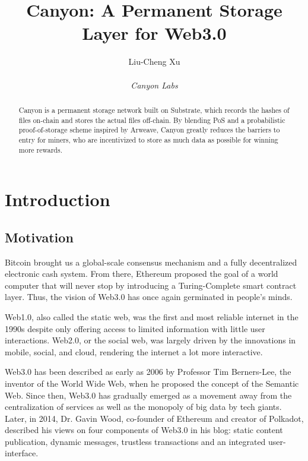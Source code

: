 \documentclass[]{article}
\title{Canyon: A Permanent Storage Layer for Web3.0}
\author{
    Liu-Cheng Xu\\
    \\
    \textit{Canyon Labs}
}
\date{}
\begin{document}
\maketitle

\begin{abstract}

Canyon is a permanent storage network built on Substrate, which records the hashes of files on-chain and stores the actual files off-chain. By blending PoS and a probabilistic proof-of-storage scheme inspired by Arweave, Canyon greatly reduces the barriers to entry for miners, who are incentivized to store as much data as possible for winning more rewards.

\end{abstract}

\tableofcontents

\newpage

\section{Introduction}

\subsection{Motivation}

Bitcoin\cite{bitcoin} brought us a global-scale consensus mechanism and a fully decentralized electronic cash system. From there, Ethereum\cite{ethereum} proposed the goal of a world computer that will never stop by introducing a Turing-Complete smart contract layer. Thus, the vision of Web3.0 has once again germinated in people's minds.

Web1.0, also called the static web, was the first and most reliable internet in the 1990s despite only offering access to limited information with little user interactions. Web2.0, or the social web, was largely driven by the innovations in mobile, social, and cloud, rendering the internet a lot more interactive.

Web3.0 has been described as early as 2006 by Professor Tim Berners-Lee, the inventor of the World Wide Web, when he proposed the concept of the Semantic Web. Since then, Web3.0 has gradually emerged as a movement away from the centralization of services as well as the monopoly of big data by tech giants. Later, in 2014, Dr. Gavin Wood, co-founder of Ethereum and creator of Polkadot, described his views on four components of Web3.0\cite{gav2014web3} in his blog: static content publication, dynamic messages, trustless transactions and an integrated user-interface.
\end{document}

